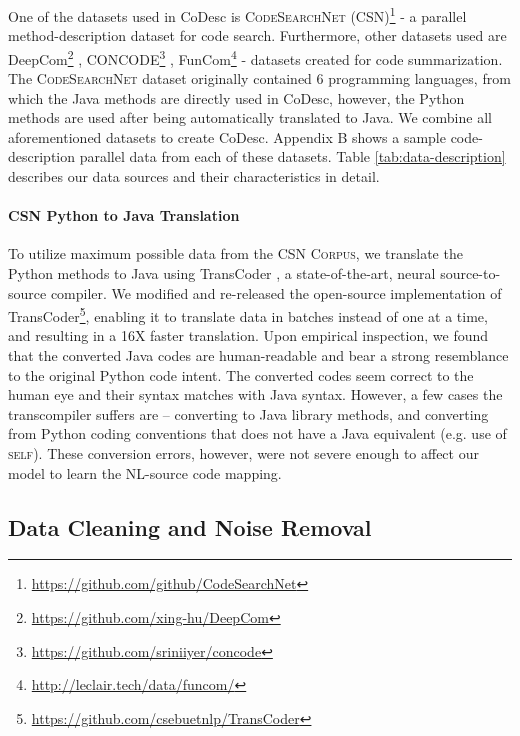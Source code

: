 \documentclass[11pt,a4paper]{article}
\begin{document}
One of the datasets used in CoDesc is \textsc{CodeSearchNet (CSN)}\footnote{\href{https://github.com/github/CodeSearchNet}{https://github.com/github/CodeSearchNet}} \cite{husain2019codesearchnet} - a parallel method-description dataset for code search. Furthermore, other datasets used are DeepCom\footnote{\href{https://github.com/xing-hu/DeepCom}{https://github.com/xing-hu/DeepCom}} \cite{deepcom}, CONCODE\footnote{\href{https://github.com/sriniiyer/concode}{https://github.com/sriniiyer/concode}} \cite{concode}, FunCom\footnote{\href{http://leclair.tech/data/funcom/}{http://leclair.tech/data/funcom/}} \cite{funcom} - datasets created for code summarization. The \textsc{CodeSearchNet} dataset originally contained 6 programming languages, from which the Java methods are directly used in CoDesc, however, the Python methods are used after being automatically translated to Java. We combine all aforementioned datasets to create CoDesc. Appendix B shows a sample code-description parallel data from each of these datasets. Table \ref{tab:data-description} describes our data sources and their characteristics in detail.




\paragraph{\textsc{CSN} Python to Java Translation} 
To utilize maximum possible data from the \textsc{CSN Corpus}, we translate the Python methods to Java using TransCoder \cite{transcoder}, a state-of-the-art, neural source-to-source compiler.
We modified and re-released the open-source implementation of TransCoder\footnote{\href{https://github.com/csebuetnlp/TransCoder}{https://github.com/csebuetnlp/TransCoder}}, enabling it to translate data in batches instead of one at a time, and resulting in a 16X faster translation. 
Upon empirical inspection, we found that the converted Java codes are human-readable and bear a strong resemblance to the original Python code intent. The converted codes seem correct to the human eye and their syntax matches with Java syntax. However, a few cases the transcompiler suffers are -- converting to Java library methods, and converting from Python coding conventions that does not have a Java equivalent (e.g. use of \textsc{self}). These conversion errors, however, were not severe enough to affect our model to learn the NL-source code mapping.


\subsection{Data Cleaning and Noise Removal}
\label{subsec:clean-data}
\end{document}
